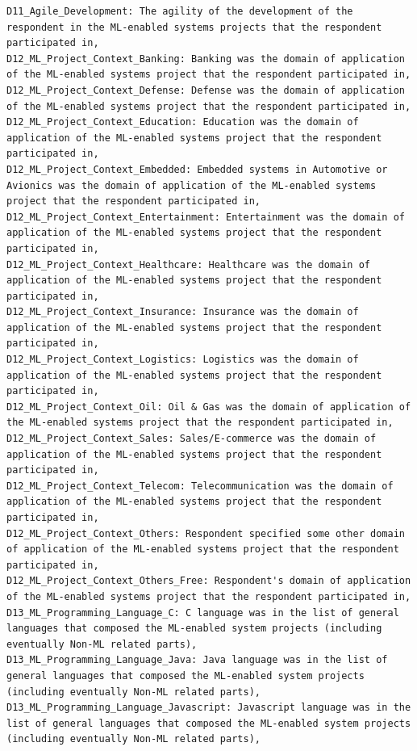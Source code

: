 \begin{verbatim}
D11_Agile_Development: The agility of the development of the respondent in the ML-enabled systems projects that the respondent participated in,
D12_ML_Project_Context_Banking: Banking was the domain of application of the ML-enabled systems project that the respondent participated in,
D12_ML_Project_Context_Defense: Defense was the domain of application of the ML-enabled systems project that the respondent participated in,
D12_ML_Project_Context_Education: Education was the domain of application of the ML-enabled systems project that the respondent participated in,
D12_ML_Project_Context_Embedded: Embedded systems in Automotive or Avionics was the domain of application of the ML-enabled systems project that the respondent participated in,
D12_ML_Project_Context_Entertainment: Entertainment was the domain of application of the ML-enabled systems project that the respondent participated in,
D12_ML_Project_Context_Healthcare: Healthcare was the domain of application of the ML-enabled systems project that the respondent participated in,
D12_ML_Project_Context_Insurance: Insurance was the domain of application of the ML-enabled systems project that the respondent participated in,
D12_ML_Project_Context_Logistics: Logistics was the domain of application of the ML-enabled systems project that the respondent participated in,
D12_ML_Project_Context_Oil: Oil & Gas was the domain of application of the ML-enabled systems project that the respondent participated in,
D12_ML_Project_Context_Sales: Sales/E-commerce was the domain of application of the ML-enabled systems project that the respondent participated in,
D12_ML_Project_Context_Telecom: Telecommunication was the domain of application of the ML-enabled systems project that the respondent participated in,
D12_ML_Project_Context_Others: Respondent specified some other domain of application of the ML-enabled systems project that the respondent participated in,
D12_ML_Project_Context_Others_Free: Respondent's domain of application of the ML-enabled systems project that the respondent participated in,
D13_ML_Programming_Language_C: C language was in the list of general languages that composed the ML-enabled system projects (including eventually Non-ML related parts),        
D13_ML_Programming_Language_Java: Java language was in the list of general languages that composed the ML-enabled system projects (including eventually Non-ML related parts),  
D13_ML_Programming_Language_Javascript: Javascript language was in the list of general languages that composed the ML-enabled system projects (including eventually Non-ML related parts),

\end{verbatim}
